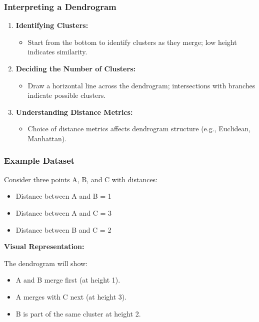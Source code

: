 \documentclass[aspectratio=169]{beamer}
\begin{document}
\begin{frame}[fragile]
    \frametitle{Interpreting a Dendrogram}
    \begin{enumerate}
        \item \textbf{Identifying Clusters:} 
            \begin{itemize}
                \item Start from the bottom to identify clusters as they merge; low height indicates similarity.
            \end{itemize}
        \item \textbf{Deciding the Number of Clusters:} 
            \begin{itemize}
                \item Draw a horizontal line across the dendrogram; intersections with branches indicate possible clusters.
            \end{itemize}
        \item \textbf{Understanding Distance Metrics:} 
            \begin{itemize}
                \item Choice of distance metrics affects dendrogram structure (e.g., Euclidean, Manhattan).
            \end{itemize}
    \end{enumerate}
\end{frame}

\begin{frame}[fragile]
    \frametitle{Example Dataset}
    Consider three points A, B, and C with distances:
    \begin{itemize}
        \item Distance between A and B = 1
        \item Distance between A and C = 3
        \item Distance between B and C = 2
    \end{itemize}
    \textbf{Visual Representation:}
    
    The dendrogram will show:
    \begin{itemize}
        \item A and B merge first (at height 1).
        \item A merges with C next (at height 3).
        \item B is part of the same cluster at height 2.
    \end{itemize}
\end{frame}
\end{document}
